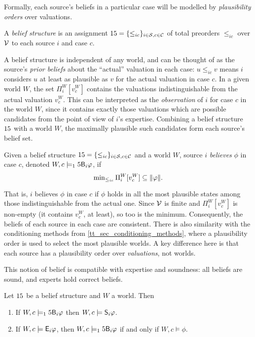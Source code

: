Formally, each source's beliefs in a particular case will be modelled by
\emph{plausibility orders} over valuations.

\begin{definition}
    A \emph{belief structure} is an assignment $\b = \{{\le_{ic}}\}_{i \in
    \srcs, c \in \css}$ of total preorders $\le_{ic}$ over $\vals$ to each
    source $i$ and case $c$.
\end{definition}

A belief structure is independent of any world, and can be thought of as the
source's \emph{prior beliefs} about the ``actual'' valuation in each case: $u
\le_{ic} v$ means $i$ considers $u$ at least as plausible as $v$ for the actual
valuation in case $c$. In a given world $W$, the set $\Pi^W_i[v^W_c]$ contains
the valuations indistinguishable from the actual valuation $v^W_c$. This can be
interpreted as the \emph{observation} of $i$ for case $c$ in the world $W$,
since it contains exactly those valuations which are possible candidates from
the point of view of $i$'s expertise. Combining a belief structure $\b$ with a
world $W$, the maximally plausible such candidates form each source's belief
set.

\begin{definition}
    Given a belief structure $\b = \{{\le_{ic}}\}_{i \in \srcs, c \in \css}$
    and a world $W$, source $i$ \emph{believes} $\phi$ in case $c$, denoted $W,
    c
    \models_\b \B_i\phi$, if
    \[
        \min\nolimits_{\le_{ic}}{\Pi^W_i[v^W_c]} \subseteq \propmods{\phi}.
    \]
\end{definition}

That is, $i$ believes $\phi$ in case $c$ if $\phi$ holds in all the most
plausible states among those indistinguishable from the actual one. Since
$\vals$ is finite and $\Pi^W_i[v^W_c]$ is non-empty (it contains $v^W_c$, at
least), so too is the minimum. Consequently, the beliefs of each source in each
case are consistent.
%
There is also similarity with the conditioning methods
from \cref{tt_sec_conditioning_methods}, where a plausibility order is used to
select the most plausible worlds. A key difference here is that each source has
a plausibility order over \emph{valuations}, not worlds.

This notion of belief is compatible with expertise and soundness: all beliefs
are sound, and experts hold correct beliefs.

\begin{proposition}
    \label{tt_prop_belief_exp_sound_compatibility}
    Let $\b$ be a belief structure and $W$ a world. Then
    \begin{enumerate}
        \item \label{tt_item_beliefs_are_sound} If $W, c \models_\b \B_i\phi$
              then $W, c \models \S_i\phi$.
          \item \label{tt_item_expertise_correct_beliefs} If $W, c \models
                \E_i\phi$, then $W, c \models_\b \B_i\phi$ if and only if $W, c
                \models \phi$.
    \end{enumerate}
\end{proposition}

